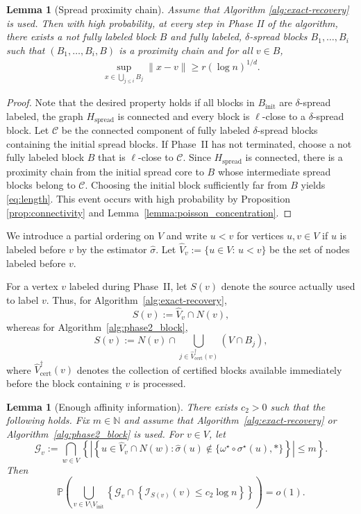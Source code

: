\documentclass[11pt, a4paper]{amsart}
\newtheorem{lemma}[theorem]{Lemma}
\renewcommand{\P}{\mathbb{P}}
\newcommand{\1}{\mathbf{1}}
\theoremstyle{definition}
\theoremstyle{remark}
\theoremstyle{definition}
\begin{document}
\begin{lemma}[Spread proximity chain] \label{lem:spread_chain} Assume that Algorithm \ref{alg:exact-recovery} is used. Then with high probability, at every step in Phase II of the algorithm, there exists a not fully labeled block $B$ and fully labeled, $\delta$-spread blocks $B_1,\dots,B_i$  such that $(B_1,\dots,B_i,B)$ is a proximity chain and for all $v \in B$,
\begin{align}
\sup_{x\in \bigcup_{j\le i}B_j}\|x-v\|
\ge r(\log n)^{1/d}.\label{eq:length}
\end{align}
\end{lemma}
\begin{proof}
Note that the desired property holds if all blocks in $B_{\mathrm{init}}$ are $\delta$-spread labeled, the graph $H_{\mathrm{spread}}$ is connected and every block is $\ell$-close to a $\delta$-spread block. Let $\mathcal C$ be the connected component of fully labeled
$\delta$-spread blocks containing the initial spread blocks. If Phase~II
has not terminated, choose a not fully labeled block $B$ that is
$\ell$-close to $\mathcal C$. Since $H_{\mathrm{spread}}$ is connected,
there is a proximity chain from the initial spread core to $B$ whose
intermediate spread blocks belong to $\mathcal C$. Choosing the initial
block sufficiently far from $B$ yields \eqref{eq:length}. This event occurs with high probability by Proposition \ref{prop:connectivity} and Lemma~\ref{lemma:poisson_concentration}.
\end{proof}


We introduce a partial ordering on $V$ and write $u<v$ for vertices $u,v \in V$ if $u$ is labeled before $v$ by the estimator $\widehat \sigma$. Let $\widehat V_v:=\{u \in V:\,u<v\}$ be the set of nodes labeled before $v$.

For a vertex $v$ labeled during Phase~II, let $S(v)$ denote the
source actually used to label $v$. Thus, for
Algorithm~\ref{alg:exact-recovery},
\[
S(v):=\widehat V_v\cap N(v),
\]
whereas for Algorithm~\ref{alg:phase2_block},
\[
S(v):=
N(v)\cap
\bigcup_{j\in \widehat V_{\mathrm{cert}}^\dagger(v)}
(V\cap B_j),
\]
where $\widehat V_{\mathrm{cert}}^\dagger(v)$ denotes the collection
of certified blocks available immediately before the block containing
$v$ is processed.

\begin{lemma}[Enough affinity information]
\label{lem:enough_info}
There exists $c_2>0$ such that the following holds.
Fix $m\in\mathbb N$ and assume that
Algorithm~\ref{alg:exact-recovery} or
Algorithm~\ref{alg:phase2_block} is used.
For $v\in V$, let
\[
\mathcal G_v
:=
\bigcap_{w\in V}
\left\{
\left|
\left\{
u\in\widehat V_v\cap N(w):
\widehat\sigma(u)
\notin
\{\omega^\star\circ\sigma^\star(u),*\}
\right\}
\right|
\le m
\right\}.
\]
Then
\[
\P\left(
\bigcup_{v\in V\setminus V_{\mathrm{init}}}
\left\{
\mathcal G_v
\cap
\left\{
\mathcal I_{S(v)}(v)\le c_2\log n
\right\}
\right\}
\right)
=o(1).
\]
\end{lemma}
\end{document}
